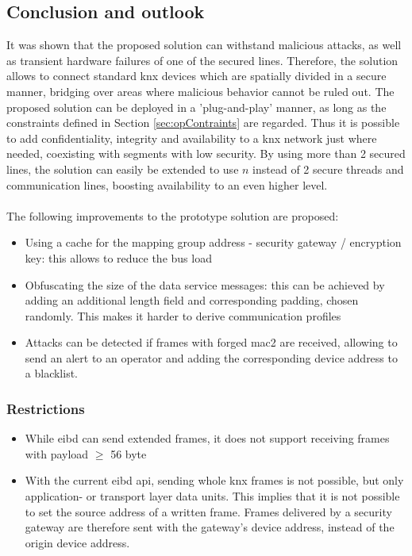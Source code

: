 \subsection{Conclusion and outlook}
It was shown that the proposed solution can withstand malicious attacks, as well as transient hardware failures of one of the secured lines. Therefore, the solution allows to connect
standard \gls{knx} devices which are spatially divided in a secure manner, bridging over areas where malicious behavior cannot be ruled out.
The proposed solution can be deployed in a 'plug-and-play' 
manner, as long as the constraints defined in Section \ref{sec:opContraints} are regarded. Thus it is possible to add confidentiality, integrity and availability to a \gls{knx}
network just where needed, coexisting with segments with low security. By using more than 2 secured lines, the solution can easily be extended to use $n$ instead of 2 secure threads
and communication lines, boosting availability to an even higher level.
\\
\\
The following improvements to the prototype solution are proposed: 
\begin{itemize}
 \item Using a cache for the mapping group address - security gateway / encryption key: this allows to reduce the bus load
 \item Obfuscating the size of the data service messages: this can be achieved by adding an additional length field and corresponding padding, chosen randomly. This makes it harder
 to derive communication profiles
 \item Attacks can be detected if frames with forged \gls{mac2} are received, allowing to send an alert to an operator and adding the corresponding device address to a blacklist. 
 \end{itemize}
 
\subsubsection{Restrictions }
\begin{itemize}
  \item While \gls{eibd} can send extended frames, it does not support receiving frames with payload $\geq$ 56 byte
  \item With the current \gls{eibd} \gls{api}, sending whole \gls{knx} frames is not possible, but only application- or transport layer data units. This implies that 
  it is not possible to set the source address of a written frame. Frames delivered by a security gateway are therefore sent with the gateway's device address, instead of the 
  origin device address.
 \end{itemize}

 
 
 

